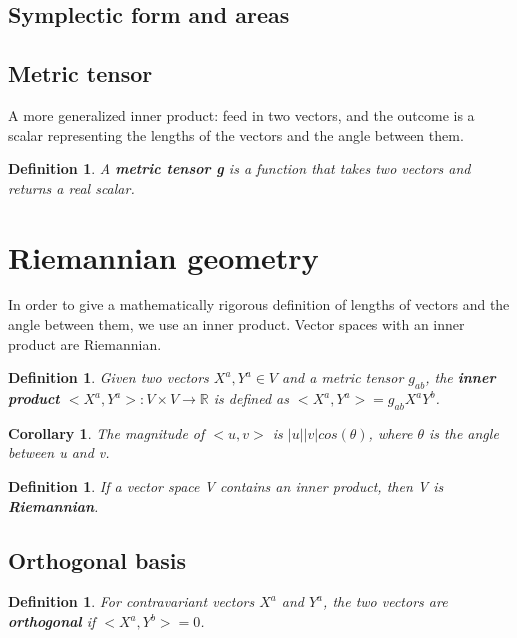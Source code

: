 \documentclass{book}
\newtheorem{defn}[equation]{Definition}
\newtheorem{coro}[equation]{Corollary}
\begin{document}
\subsection{Symplectic form and areas}



\subsection{Metric tensor}
A more generalized inner product: feed in two vectors, and the outcome is a scalar representing the lengths of the vectors and the angle between them. 

\begin{defn}
	A \textbf{metric tensor g} is a function that takes two vectors and returns a real scalar. 
\end{defn}


\section{Riemannian geometry}
In order to give a mathematically rigorous definition of lengths of vectors and the angle between them, we use an inner product. Vector spaces with an inner product are Riemannian.

\begin{defn}
	Given two vectors $X^a,Y^a \in V$ and a metric tensor $g_{ab}$, the \textbf{inner product} $<X^a,Y^a> : V \times V \to \mathbb{R}$ is defined as $<X^a,Y^a> = g_{ab}X^aY^b$. 
\end{defn}

\begin{coro}
	The magnitude of $<u,v>$ is $|u||v|cos(\theta)$, where $\theta$ is the angle between u and v. 
\end{coro}

\begin{defn}
	If a vector space V contains an inner product, then V is \textbf{Riemannian}.
	\end{defn}



\subsection{Orthogonal basis}

\begin{defn}
	For contravariant vectors $X^a$ and $Y^a$, the two vectors are \textbf{orthogonal} if $<X^a,Y^b> = 0$. 
\end{defn}
\end{document}
